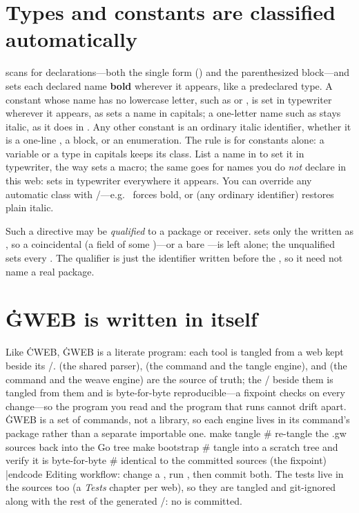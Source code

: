 \section{Types and constants are classified automatically}
 scans for  declarations---both the single form () and the parenthesized block---and sets each declared name {\bf bold}
wherever it appears, like a predeclared type. A constant whose name has no
lowercase letter, such as  or , is set in typewriter
wherever it appears, as  sets a name in capitals; a one-letter name
such as  stays italic, as it does in . Any other constant is an
ordinary italic identifier, whether it is a one-line , a
block, or an  enumeration. The rule is for constants alone: a variable
or a type in capitals keeps its class. List a name in  to set it in
typewriter, the way  sets a  macro; the same goes for names you
do {\it not\/} declare in this web:  sets  in
typewriter everywhere it appears. You can override any automatic
class with /---e.g.\  forces  bold, or
 (any ordinary identifier) restores plain italic.

Such a directive may be {\it qualified\/} to a package or receiver.  sets only the  written as , so a coincidental
 (a  field of some )---or a bare ---is
left alone; the unqualified  sets every . The qualifier is
just the identifier written before the , so it need not name a real
package.

\section{\.{GWEB} is written in itself}
Like \.{CWEB}, \.{GWEB} is a literate program: each tool is tangled from a  web
kept beside its \GO/.  (the shared parser),
 (the command and the tangle engine), and
 (the command and the weave engine) are the source of
truth; the \GO/ beside them is tangled from them and is byte-for-byte
reproducible---a fixpoint  checks on every change---so the
program you read and the program that runs cannot drift apart. \.{GWEB} is a set
of commands, not a library, so each engine lives in its command's 
package rather than a separate importable one.
\begincode
make tangle       # re-tangle the .gw sources back into the Go tree
make bootstrap    # tangle into a scratch tree and verify it is byte-for-byte
                  # identical to the committed sources (the fixpoint)
|endcode
\noindent Editing workflow: change a , run , then commit
both. The tests live in the  sources too (a {\it Tests\/} chapter per
web), so they are tangled and git-ignored along with the rest of the generated
\GO/: no  is committed.

